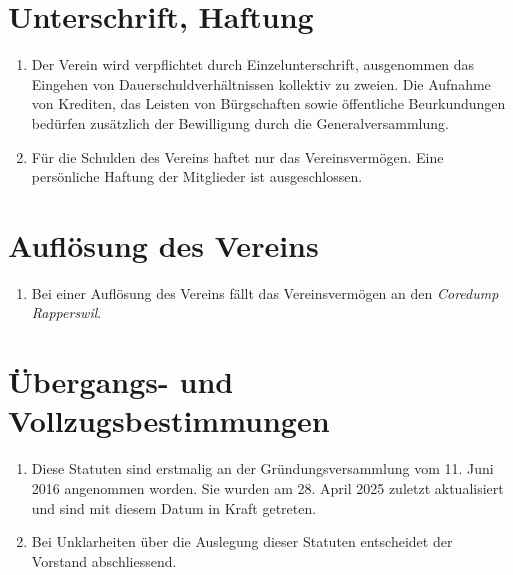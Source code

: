 \documentclass[10pt,a4paper,parskip,fleqn]{scrartcl}
\newcommand{\ol}{\begin{enumerate}[itemsep=-0.2em,topsep=-0.2em]}
\newcommand{\lo}{\end{enumerate}}
\newcommand{\li}{\item}
\newcommand{\parent}{Coredump Rapperswil\xspace}
\newcommand{\iparent}{\textit{\parent}\xspace}
\begin{document}
\section{Unterschrift, Haftung}

\ol
	\li Der Verein wird verpflichtet durch Einzelunterschrift, ausgenommen das
	Eingehen von Dauerschuldverhältnissen kollektiv zu zweien. Die Aufnahme von
	Krediten, das Leisten von Bürgschaften sowie öffentliche Beurkundungen
	bedürfen zusätzlich der Bewilligung durch die Generalversammlung.
	\li Für die Schulden des Vereins haftet nur das Vereinsvermögen. Eine
	persönliche Haftung der Mitglieder ist ausgeschlossen.
\lo


\section{Auflösung des Vereins}

\ol
	\li Bei einer Auflösung des Vereins fällt das Vereinsvermögen an den \iparent.
\lo


\section{Übergangs- und Vollzugsbestimmungen}

\ol
	\li Diese Statuten sind erstmalig an der Gründungsversammlung vom 11. Juni
	2016 angenommen worden. Sie wurden am 28. April 2025 zuletzt aktualisiert
	und sind mit diesem Datum in Kraft getreten.
	\li Bei Unklarheiten über die Auslegung dieser Statuten entscheidet der
	Vorstand abschliessend.
\lo
\end{document}
